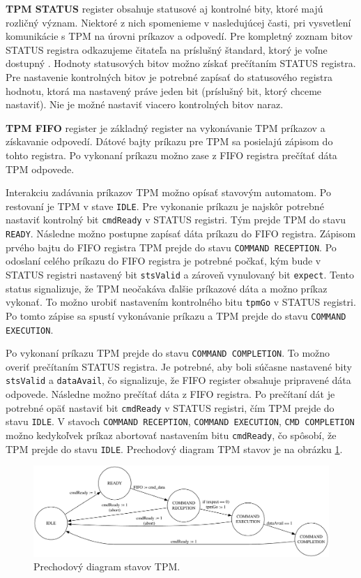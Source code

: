\textbf{TPM STATUS} register obsahuje statusové aj kontrolné bity, ktoré majú rozličný význam. Niektoré z nich spomenieme v nasledujúcej časti, pri vysvetlení komunikácie s TPM na úrovni príkazov a odpovedí. Pre kompletný zoznam bitov STATUS registra odkazujeme čitateľa na príslušný štandard, ktorý je voľne dostupný \cite{tpmTis}. Hodnoty statusových bitov možno získať prečítaním STATUS registra. Pre nastavenie kontrolných bitov je potrebné zapísať do statusového registra hodnotu, ktorá ma nastavený práve jeden bit (príslušný bit, ktorý chceme nastaviť). Nie je možné nastaviť viacero kontrolných bitov naraz.

\textbf{TPM FIFO} register je základný register na vykonávanie TPM príkazov a získavanie odpovedí. Dátové bajty príkazu pre TPM sa posielajú zápisom do tohto registra. Po vykonaní príkazu možno zase z FIFO registra prečítať dáta TPM odpovede.

Interakciu zadávania príkazov TPM možno opísať stavovým automatom. Po restovaní je TPM v stave \texttt{IDLE}. Pre vykonanie príkazu je najskôr potrebné nastaviť kontrolný bit \texttt{cmdReady} v STATUS registri. Tým prejde TPM do stavu \texttt{READY}. Následne možno postupne zapísať dáta príkazu do FIFO registra. Zápisom prvého bajtu do FIFO registra TPM prejde do stavu \texttt{COMMAND RECEPTION}. Po odoslaní celého príkazu do FIFO registra je potrebné počkať, kým bude v STATUS registri nastavený bit \texttt{stsValid} a zároveň vynulovaný bit \texttt{expect}. Tento status signalizuje, že TPM neočakáva ďalšie príkazové dáta a možno príkaz vykonať. To možno urobiť nastavením kontrolného bitu \texttt{tpmGo} v STATUS registri. Po tomto zápise sa spustí vykonávanie príkazu a TPM prejde do stavu \texttt{COMMAND EXECUTION}.

Po vykonaní príkazu TPM prejde do stavu \texttt{COMMAND COMPLETION}. To možno overiť prečítaním STATUS registra. Je potrebné, aby boli súčasne nastavené bity \texttt{stsValid} a \texttt{dataAvail}, čo signalizuje, že FIFO register obsahuje pripravené dáta odpovede. Následne možno prečítať dáta z FIFO registra. Po prečítaní dát je potrebné opäť nastaviť  bit \texttt{cmdReady} v STATUS registri, čím TPM prejde do stavu \texttt{IDLE}. V stavoch \texttt{COMMAND RECEPTION}, \texttt{COMMAND EXECUTION}, \texttt{CMD COMPLETION} možno kedykoľvek príkaz abortovať nastavením bitu \texttt{cmdReady}, čo spôsobí, že TPM prejde do stavu \texttt{IDLE}. Prechodový diagram TPM stavov je na obrázku \ref{obr:tpmStateTransition}.

\begin{figure}
    \centerline{\includegraphics[width=1\textwidth]{images/misc/tpmStateTransition.pdf}}
    \caption[Prechodový diagram stavov TPM]{Prechodový diagram stavov TPM.}
    \label{obr:tpmStateTransition}
\end{figure}

